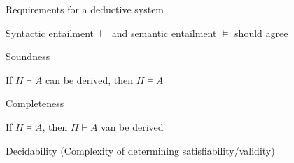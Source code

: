 	\item Requirements for a deductive system
	\enumstart
		\item Syntactic entailment $\vdash$ and semantic entailment $\vDash$ should agree
		\item Soundness
		\enumstart
			\item If $H \vdash A$ can be derived, then $H \vDash A$
		\enumend
		\item Completeness
		\enumstart
			\item If $H \vDash A$, then $H \vdash A$ van be derived
		\enumend
		\item Decidability (Complexity of determining satisfiability/validity)
	\enumend
\enumend
